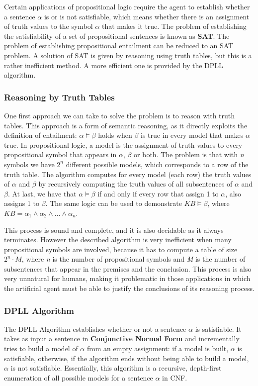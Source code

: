 \documentclass{article}
\begin{document}
Certain applications of propositional logic require the agent to establish whether a sentence \(\alpha\) is or is not satisfiable, which means whether there is an assignment of truth values to the symbol \(\alpha\) that makes it true. The problem of establishing the satisfiability of a set of propositional sentences is known as \textbf{SAT}. The problem of establishing propositional entailment can be reduced to an SAT problem. A solution of SAT is given by reasoning using truth tables, but this is a rather inefficient method. A more efficient one is provided by the DPLL algorithm.

\subsubsection{Reasoning by Truth Tables}
One first approach we can take to solve the problem is to reason with truth tables. This approach is a form of semantic reasoning, as it directly exploits the definition of entailment: \(\alpha\models\beta\) holds when \(\beta\) is true in every model that makes \(\alpha\) true. In propositional logic, a model is the assignment of truth values to every propositional symbol that appears in \(\alpha\), \(\beta\) or both. The problem is that with \textit{n} symbols we have \(2^n\) different possible models, which corresponds to a row of the truth table. The algorithm computes for every model (each row) the truth values of \(\alpha\) and \(\beta\) by recursively computing the truth values of all subsentences of \(\alpha\) and \(\beta\). At last, we have that \(\alpha\models\beta\) if and only if every row that assign 1 to \(\alpha\), also assigns 1 to \(\beta\). The same logic can be used to demonstrate \(KB\models\beta\), where \(KB=\alpha_1\land\alpha_2\land...\land\alpha_n\).

This process is sound and complete, and it is also decidable as it always terminates. However the described algorithm is very inefficient when many propositional symbols are involved, because it has to compute a table of size \(2^n\cdot M\), where \textit{n} is the number of propositional symbols and \textit{M} is the number of subsentences that appear in the premises and the conclusion. This process is also very unnatural for humans, making it problematic in those applications in which the artificial agent must be able to justify the conclusions of its reasoning process.

\subsubsection{DPLL Algorithm}
The DPLL Algorithm establishes whether or not a sentence \(\alpha\) is satisfiable. It takes as input a sentence in \textbf{Conjunctive Normal Form} and incrementally tries to build a model of \(\alpha\) from an empty assignment: if a model is built, \(\alpha\) is satisfiable, otherwise, if the algorithm ends without being able to build a model, \(\alpha\) is not satisfiable. Essentially, this algorithm is a recursive, depth-first enumeration of all possible models for a sentence \(\alpha\) in CNF.
\end{document}
